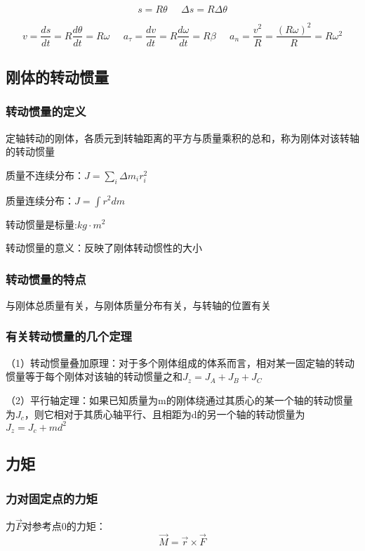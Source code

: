 \documentclass[UTF8]{article}
\begin{document}
    \[s = R\theta\;\;\;\;\;\Delta s = R\Delta\theta\]

    \[v = \frac{ds}{dt} = R\frac{d\theta}{dt} = R\omega\;\;\;\;\;a_\tau = \frac{dv}{dt} = R\frac{d\omega}{dt} = R\beta\;\;\;\;\;a_n = \frac{v^2}{R} = \frac{(R\omega)^2}{R} = R\omega^2\]
\subsection{刚体的转动惯量}
\subsubsection{转动惯量的定义}

    定轴转动的刚体，各质元到转轴距离的平方与质量乘积的总和，称为刚体对该转轴的转动惯量

    质量不连续分布：$J = \sum_i \Delta m_ir_i^2$

    质量连续分布：$J = \int r^2dm$

    转动惯量是标量\;\;\;\;\;[SI]:$kg\cdot m^2$

    转动惯量的意义：反映了刚体转动惯性的大小

\subsubsection{转动惯量的特点}

    与刚体总质量有关，与刚体质量分布有关，与转轴的位置有关

\subsubsection{有关转动惯量的几个定理}

    （1）转动惯量叠加原理：对于多个刚体组成的体系而言，相对某一固定轴的转动惯量等于每个刚体对该轴的转动惯量之和$J_z = J_A + J_B + J_C$

    （2）平行轴定理：如果已知质量为m的刚体绕通过其质心的某一个轴的转动惯量为$J_c$，则它相对于其质心轴平行、且相距为d的另一个轴的转动惯量为$J_z = J_c + md^2$

\subsection{力矩}
\subsubsection{力对固定点的力矩}

    力$\vec{F}$对参考点0的力矩：\[\vec{M} = \vec{r}\times\vec{F}\]
\end{document}
